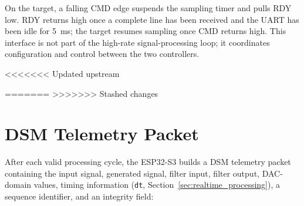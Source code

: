 On the target, a falling CMD edge suspends the sampling timer and pulls RDY
low. RDY returns high once a complete line has been received and the UART has
been idle for 5~ms; the target resumes sampling once CMD returns high. This
interface is not part of the high-rate signal-processing loop; it coordinates
configuration and control between the two controllers.

<<<<<<< Updated upstream



=======
>>>>>>> Stashed changes

\section{DSM Telemetry Packet}
\label{sec:dsm_telemetry}

After each valid processing cycle, the ESP32-S3 builds a DSM telemetry packet
containing the input signal, generated signal, filter input, filter output,
DAC-domain values, timing information (\texttt{dt},
Section~\ref{sec:realtime_processing}), a sequence identifier, and an integrity
field:


